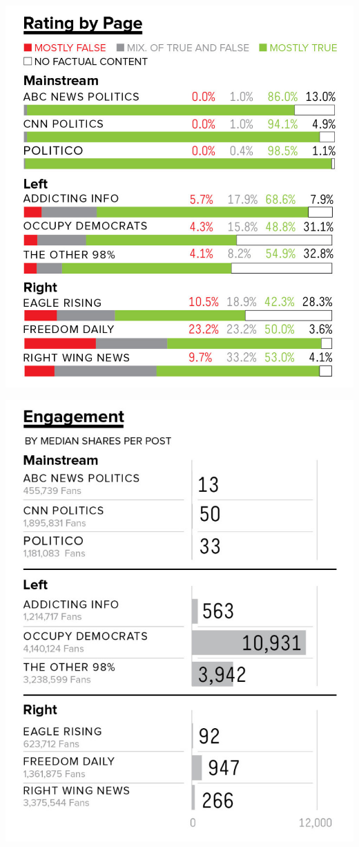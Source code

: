 \documentclass[11pt]{article}
\begin{document}
\begin{center}
	\includegraphics[scale=0.2]{PageVeracity.jpg}
\end{center}

\begin{center}
	\includegraphics[scale=0.2]{Engagement.jpg}
\end{center}
\end{document}
